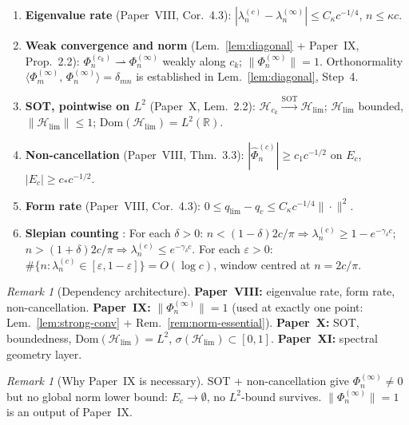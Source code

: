 \documentclass[12pt,a4paper]{amsart}
\theoremstyle{definition}
\theoremstyle{remark}
\newtheorem{remark}[theorem]{Remark}
\newcommand{\Phihat}{\widehat{\Phi}}
\newcommand{\ip}[2]{\langle #1,\, #2\rangle}
\newcommand{\Hlim}{\mathcal{H}_{\lim}}
\newcommand{\Dom}{\mathrm{Dom}}
\begin{document}
\begin{enumerate}[(XI.1)]
\item\label{XI1}
  \textbf{Eigenvalue rate} (Paper~VIII, Cor.~4.3):
  $|\lambda_n^{(c)}-\lambda_n^{(\infty)}|
  \le C_\kappa c^{-1/4}$, $n\le\kappa c$.
\item\label{XI2}
  \textbf{Weak convergence and norm}
  (Lem.~\ref{lem:diagonal} + Paper~IX, Prop.~2.2):
  $\Phi_n^{(c_k)}\rightharpoonup\Phi_n^{(\infty)}$
  weakly along $c_k$;
  $\|\Phi_n^{(\infty)}\|=1$.
  Orthonormality $\ip{\Phi_m^{(\infty)}}{\Phi_n^{(\infty)}}
  =\delta_{mn}$ is established in
  Lem.~\ref{lem:diagonal}, Step~4.
\item\label{XI3}
  \textbf{SOT, pointwise on $L^2$}
  (Paper~X, Lem.~2.2):
  $\mathcal{H}_{c_k}
  \xrightarrow{\mathrm{SOT}}\Hlim$;
  $\Hlim$ bounded, $\|\Hlim\|\le 1$;
  $\Dom(\Hlim)=L^2(\mathbb{R})$.
\item\label{XI4}
  \textbf{Non-cancellation} (Paper~VIII, Thm.~3.3):
  $|\Phihat_n^{(c)}|\ge c_1 c^{-1/2}$ on
  $E_c$, $|E_c|\ge c_*c^{-1/2}$.
\item\label{XI5}
  \textbf{Form rate} (Paper~VIII, Cor.~4.3):
  $0\le q_{\lim}-q_c
  \le C_\kappa c^{-1/4}\|{\cdot}\|^2$.
\item\label{XI6}
  \textbf{Slepian counting}
  \cite{Slepian1961,Osipov2013}:
  For each $\delta>0$:
  $n<(1{-}\delta)2c/\pi
  \Rightarrow\lambda_n^{(c)}\ge 1-e^{-\gamma_\delta c}$;
  $n>(1{+}\delta)2c/\pi
  \Rightarrow\lambda_n^{(c)}\le e^{-\gamma_\delta c}$.
  For each $\varepsilon>0$:
  $\#\{n:\lambda_n^{(c)}
  \in[\varepsilon,1{-}\varepsilon]\}
  =O(\log c)$,
  window centred at $n=2c/\pi$.
\end{enumerate}

\begin{remark}[Dependency architecture]
\textbf{Paper~VIII:} eigenvalue rate, form rate,
non-cancellation.
\textbf{Paper~IX:} $\|\Phi_n^{(\infty)}\|=1$
(used at exactly one point:
Lem.~\ref{lem:strong-conv} +
Rem.~\ref{rem:norm-essential}).
\textbf{Paper~X:} SOT, boundedness,
$\Dom(\Hlim)=L^2$, $\sigma(\Hlim)\subset[0,1]$.
\textbf{Paper~XI:} spectral geometry layer.
\end{remark}

\begin{remark}[Why Paper~IX is necessary]
SOT + non-cancellation give $\Phi_n^{(\infty)}\ne 0$
but no global norm lower bound:
$E_c\to\emptyset$, no $L^2$-bound survives.
$\|\Phi_n^{(\infty)}\|=1$ is an output of Paper~IX.
\end{remark}
\end{document}
